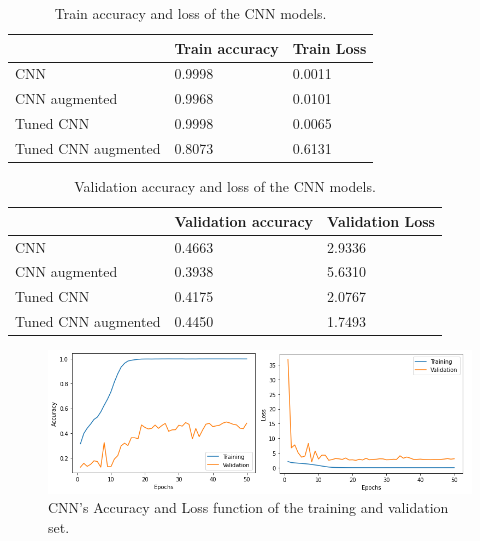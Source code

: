 \begin{table}[ht]
\begin{tabular}{|l|l|l|}
\hline
                    & Train accuracy & Train Loss \\ \hline
CNN                 & 0.9998         & 0.0011     \\ \hline
CNN augmented       & 0.9968         & 0.0101     \\ \hline
Tuned CNN           & 0.9998         & 0.0065     \\ \hline
Tuned CNN augmented & 0.8073         & 0.6131     \\ \hline
\end{tabular}
\caption{Train accuracy and loss of the CNN models.}
\label{table:train_CNN}
\end{table}

\begin{table}[ht]
\begin{tabular}{|l|l|l|}
\hline
                    & Validation accuracy & Validation Loss \\ \hline
CNN                 & 0.4663              & 2.9336          \\ \hline
CNN augmented       & 0.3938              & 5.6310          \\ \hline
Tuned CNN           & 0.4175              & 2.0767          \\ \hline
Tuned CNN augmented & 0.4450              & 1.7493          \\ \hline
\end{tabular}
\caption{Validation accuracy and loss of the CNN models.}
\label{table:validation_CNN}
\end{table}

\begin{figure}[ht]
\centering
\includegraphics[scale=0.6]{images/2021-val-train.png}
\caption{CNN's Accuracy and Loss function of the training and validation set.}
\label{fig:Acc_Loss_2021}
\end{figure}

